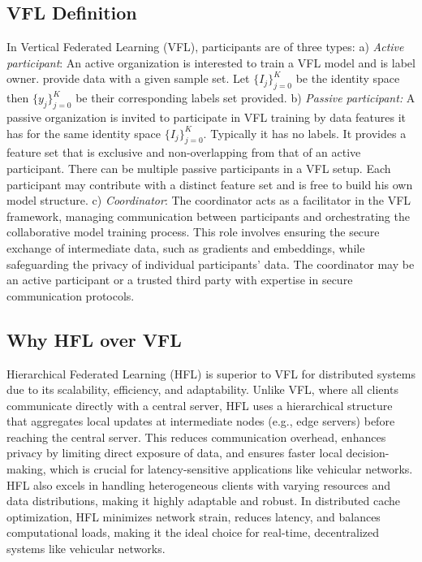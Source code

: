 \documentclass[journal]{IEEEtran}
\begin{document}
\subsection{VFL Definition}
In Vertical Federated Learning (VFL), participants are of three types: a) \textit{ Active participant}: An active organization is interested to train a VFL model and is label owner. provide data with a given sample set. Let $\{I_j\}_{j=0}^K$ be the identity space then $\{y_j\}_{j=0}^K$ be their corresponding labels set provided. b) \textit{Passive participant:} A passive organization is invited to participate in VFL training by data features it has for the same identity space $\{I_j\}_{j=0}^K$. Typically it has no labels. It provides a feature set that is exclusive and non-overlapping from that of an active participant. There can be multiple passive participants in a VFL setup. Each participant may contribute with a distinct feature set and is free to build his own model structure. c) \textit{Coordinator}: The coordinator acts as a facilitator in the VFL framework, managing communication between participants and orchestrating the collaborative model training process. This role involves ensuring the secure exchange of intermediate data, such as gradients and embeddings, while safeguarding the privacy of individual participants' data. The coordinator may be an active participant or a trusted third party with expertise in secure communication protocols.

\subsection{Why HFL over VFL}
Hierarchical Federated Learning (HFL) is superior to VFL for distributed systems due to its scalability, efficiency, and adaptability. Unlike VFL, where all clients communicate directly with a central server, HFL uses a hierarchical structure that aggregates local updates at intermediate nodes (e.g., edge servers) before reaching the central server. This reduces communication overhead, enhances privacy by limiting direct exposure of data, and ensures faster local decision-making, which is crucial for latency-sensitive applications like vehicular networks. HFL also excels in handling heterogeneous clients with varying resources and data distributions, making it highly adaptable and robust. In distributed cache optimization, HFL minimizes network strain, reduces latency, and balances computational loads, making it the ideal choice for real-time, decentralized systems like vehicular networks.
\end{document}
